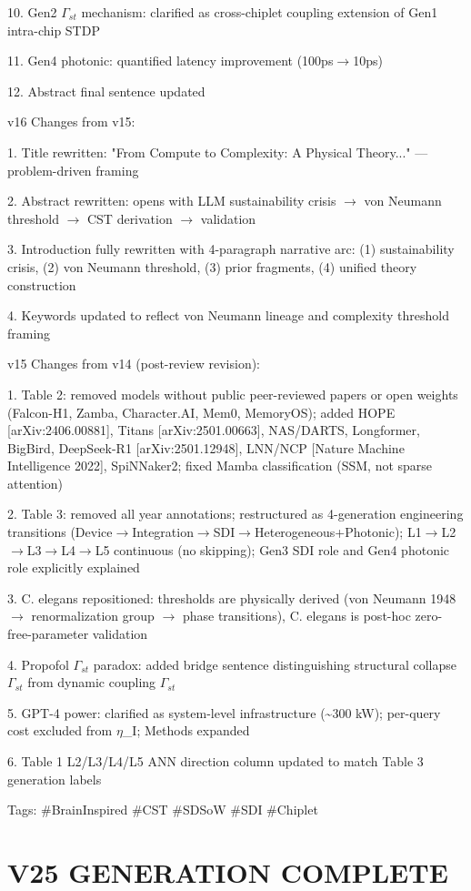 \documentclass[a4paper,12pt]{article}
\begin{document}
10. Gen2 $\Gamma_{st}$ mechanism: clarified as cross-chiplet coupling extension of Gen1 intra-chip STDP

11. Gen4 photonic: quantified latency improvement (100ps$\rightarrow$10ps)

12. Abstract final sentence updated

v16 Changes from v15:

1. Title rewritten: "From Compute to Complexity: A Physical Theory..." --- problem-driven framing

2. Abstract rewritten: opens with LLM sustainability crisis $\rightarrow$ von Neumann threshold $\rightarrow$ CST derivation $\rightarrow$ validation

3. Introduction fully rewritten with 4-paragraph narrative arc: (1) sustainability crisis, (2) von Neumann threshold, (3) prior fragments, (4) unified theory construction

4. Keywords updated to reflect von Neumann lineage and complexity threshold framing

v15 Changes from v14 (post-review revision):

1. Table 2: removed models without public peer-reviewed papers or open weights (Falcon-H1, Zamba, Character.AI, Mem0, MemoryOS); added HOPE [arXiv:2406.00881], Titans [arXiv:2501.00663], NAS/DARTS, Longformer, BigBird, DeepSeek-R1 [arXiv:2501.12948], LNN/NCP [Nature Machine Intelligence 2022], SpiNNaker2; fixed Mamba classification (SSM, not sparse attention)

2. Table 3: removed all year annotations; restructured as 4-generation engineering transitions (Device$\rightarrow$Integration$\rightarrow$SDI$\rightarrow$Heterogeneous+Photonic); L1$\rightarrow$L2$\rightarrow$L3$\rightarrow$L4$\rightarrow$L5 continuous (no skipping); Gen3 SDI role and Gen4 photonic role explicitly explained

3. C. elegans repositioned: thresholds are physically derived (von Neumann 1948 $\rightarrow$ renormalization group $\rightarrow$ phase transitions), C. elegans is post-hoc zero-free-parameter validation

4. Propofol $\Gamma_{st}$ paradox: added bridge sentence distinguishing structural collapse $\Gamma_{st}$ from dynamic coupling $\Gamma_{st}$

5. GPT-4 power: clarified as system-level infrastructure (\textasciitilde{}300 kW); per-query cost excluded from $\eta$\_I; Methods expanded

6. Table 1 L2/L3/L4/L5 ANN direction column updated to match Table 3 generation labels

Tags: \#BrainInspired \#CST \#SDSoW \#SDI \#Chiplet

\section*{V25 GENERATION COMPLETE}
\end{document}
